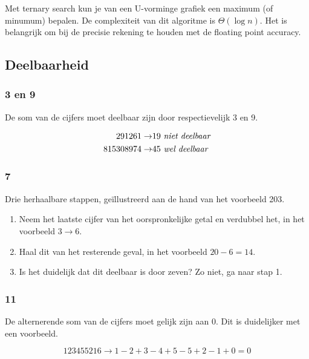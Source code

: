 \documentclass[10pt,hidelinks]{article}
\begin{document}
Met ternary search kun je van een U-vorminge grafiek een maximum (of minumum) bepalen. De complexiteit van dit algoritme is $\Theta(\log n)$. Het is belangrijk om bij de precisie rekening te houden met de floating point accuracy.



\subsection{Deelbaarheid}

\subsubsection{3 en 9}

De som van de cijfers moet deelbaar zijn door respectievelijk 3 en 9.

\begin{align*}
	291261 \to & 19 \text{ \emph{niet deelbaar}} \\
	815308974 \to & 45 \text{ \emph{wel deelbaar}}
\end{align*}

\subsubsection{7}

Drie herhaalbare stappen, ge\"illustreerd aan de hand van het voorbeeld 203.

\begin{enumerate}
	\item Neem het laatste cijfer van het oorspronkelijke getal en verdubbel het, in het voorbeeld $3 \to 6$.
	\item Haal dit van het resterende geval, in het voorbeeld $20 - 6 = 14$.
	\item Is het duidelijk dat dit deelbaar is door zeven? Zo niet, ga naar stap 1.
\end{enumerate}

\subsubsection{11}

De alternerende som van de cijfers moet gelijk zijn aan 0. Dit is duidelijker met een voorbeeld.

\[123455216 \to 1 - 2 + 3 - 4 + 5 - 5 + 2 - 1 + 0 = 0\]
\end{document}
